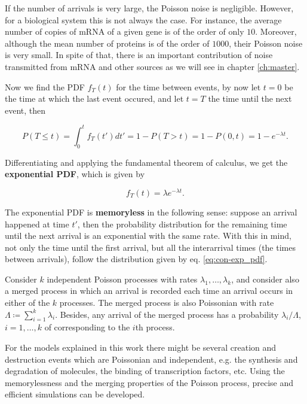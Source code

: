 If the number of arrivals is very large, the Poisson noise is negligible. However, for a biological system this is not always the case. For instance, the average number of copies of mRNA of a given gene is of the order of only $10$. Moreover, although the mean number of proteins is of the order of $1000$, their Poisson noise is very small. In spite of that, there is an important contribution of noise transmitted from mRNA and other sources as we will see in chapter \ref{ch:master}.

Now we find the PDF $f_T(t)$ for the time between events, by now let $t=0$ be the time at which the last event occured, and let $t=T$ the time until the next event, then

\begin{equation*}
  P(T\leq t) =\int_0^tf_T(t')dt'=1-P(T>t) = 1 - P(0,t) = 1 - e^{-\lambda t}.
\end{equation*}

Differentiating and applying the fundamental theorem of calculus, we get the \textbf{exponential PDF}, which is given by

\begin{equation}
  \label{eq:con-exp_pdf}
  f_T(t) = \lambda e^{-\lambda t}.
\end{equation}

The exponential PDF is \textbf{memoryless} in the following sense: suppose an arrival happened at time $t'$, then the probability distribution for the remaining time until the next arrival is an exponential with the same rate. With this in mind, not only the time until the first arrival, but all the interarrival times (the times between arrivals), follow the distribution given by eq. \eqref{eq:con-exp_pdf}.

Consider $k$ independent Poisson processes with rates $\lambda_1,\dotsc,\lambda_k$, and consider also a merged process in which an arrival is recorded each time an arrival occurs in either of the $k$ processes. The merged process is also Poissonian with rate $\Lambda\coloneqq\sum_{i=1}^k\lambda_i$. Besides, any arrival of the merged process has a probability $\lambda_i/\Lambda$, $i=1,\dotsc,k$ of corresponding to the $i$th process.

For the models explained in this work there might be several creation and destruction events which are Poissonian and independent, e.g. the synthesis and degradation of molecules, the binding of transcription factors, etc. Using the memorylessness and the merging properties of the Poisson process, precise and efficient simulations can be developed.

